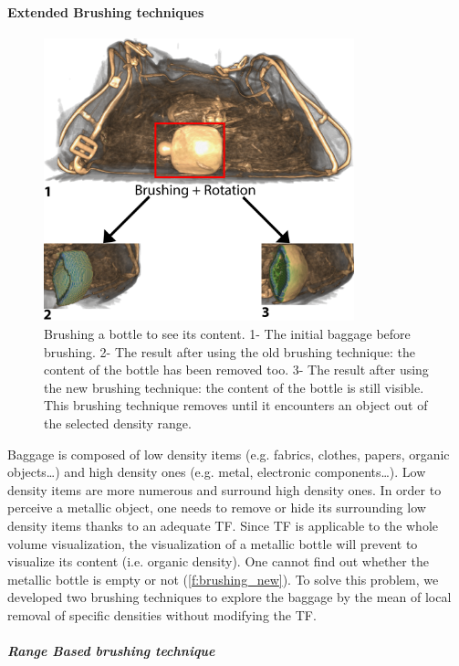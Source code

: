 \paragraph{Extended Brushing techniques}

\begin{figure}
\centering   	\includegraphics[width=9cm]{Figures/brushing-new.png}
	\caption{ Brushing a bottle to see its content.  1- The initial baggage before brushing. 2- The result after using the old brushing technique: the content of the bottle has been removed too. 3- The result after using the new brushing technique: the content of the bottle is still visible. This brushing technique removes until it encounters an object out of the selected density range. }
	\label{f:brushing_new}
\end{figure}

Baggage is composed of low density items (e.g. fabrics, clothes, papers, organic objects…) and high density ones (e.g. metal, electronic components…). Low density items are more numerous and surround high density ones. In order to perceive a metallic object, one needs to remove or hide its surrounding low density items thanks to an adequate TF. Since TF is applicable to the whole volume visualization, the visualization of a metallic bottle will prevent to visualize its content (i.e. organic density). One cannot find out whether the metallic bottle is empty or not (\autoref{f:brushing_new}). To solve this problem, we developed two brushing techniques to explore the baggage by the mean of local removal of specific densities without modifying the TF.

\subparagraph{Range Based brushing technique}

